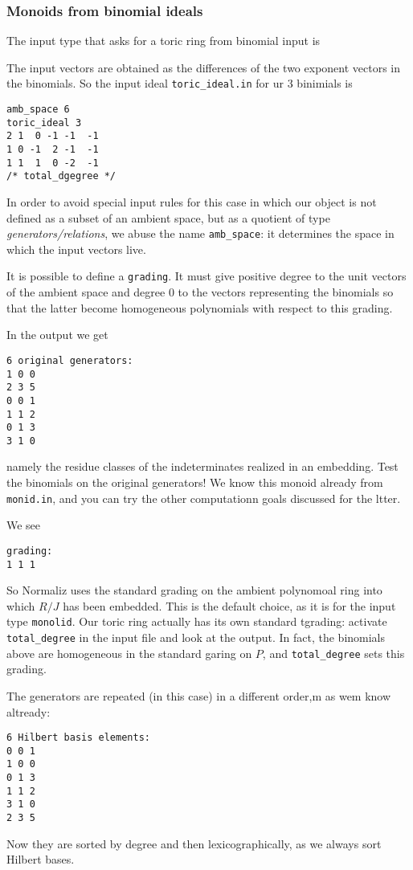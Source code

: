 \subsubsection{Monoids from binomial ideals}\label{toric_ideal}
The input type that asks for a toric ring from binomial input is
\begin{itemize}
\end{itemize}
The input vectors are obtained as the differences of the two exponent vectors in the binomials. So the input ideal \verb+toric_ideal.in+ for ur $3$ binimials is
\begin{Verbatim}
amb_space 6
toric_ideal 3
2 1  0 -1 -1  -1
1 0 -1  2 -1  -1
1 1  1  0 -2  -1
/* total_dgegree */
\end{Verbatim}
In order to avoid special input rules for this case in which our object is not defined as a subset of an ambient space, but as a quotient of type \emph{generators/relations}, we abuse the name \verb|amb_space|: it determines the space in which the input vectors live.

It is possible to define a \verb|grading|. It must give positive degree to the unit vectors of the ambient space and degree $0$ to the vectors representing the binomials so that the latter become homogeneous polynomials with respect to this grading.

In the output we get
\begin{Verbatim}
6 original generators:
1 0 0
2 3 5
0 0 1
1 1 2
0 1 3
3 1 0
\end{Verbatim}
namely the residue classes of the indeterminates realized in an embedding. Test the binomials on the original generators! We know this monoid already from \verb|monid.in|, and you can try the other computationn goals discussed for the ltter.

We see
\begin{Verbatim}
grading:
1 1 1 
\end{Verbatim}
So Normaliz uses the standard grading on the ambient polynomoal ring into which $R/J$ has been embedded. This is the default choice, as it is for the input type \verb|monolid|. Our toric ring actually has its own standard tgrading: activate \verb|total_degree| in the input file and look at the output. In fact, the binomials above are homogeneous in the standard garing on $P$, and \verb|total_degree| sets this grading.

The generators are repeated (in this case) in a different order,m as wem know altready:
\begin{Verbatim}
6 Hilbert basis elements:
0 0 1
1 0 0
0 1 3
1 1 2
3 1 0
2 3 5
\end{Verbatim}
Now they are sorted by degree and then lexicographically, as we always sort Hilbert bases.

